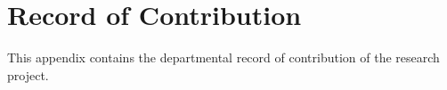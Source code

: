 %
%
%                 

\chapter{Record of Contribution}
\label{sec:appendixc}

This appendix contains the departmental record of contribution of the research project.

\begin{figure}
  \centering
\end{figure}
